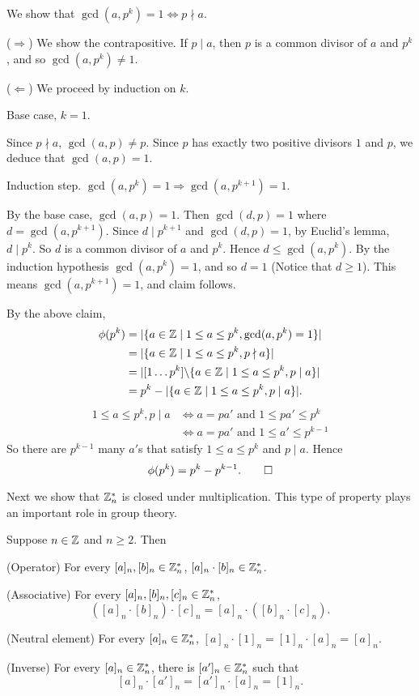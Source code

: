 \begin{solve}
    We show that $\gcd(a,p^k)=1\Leftrightarrow p\nmid a$.

    ($\Rightarrow$) We show the contrapositive. If $p\mid a$,
    then $p$ is a common divisor of $a$ and $p^k$, and so $\gcd(a,p^k)\neq 1$.

    ($\Leftarrow$) We proceed by induction on $k$.

    Base case, $k=1$.

    Since $p\nmid a$, $\gcd(a,p)\neq p$. Since $p$ has exactly two positive
    divisors $1$ and $p$, we deduce that $\gcd(a,p)=1$.

    Induction step. $\gcd(a,p^k)=1\Rightarrow\gcd(a,p^{k+1})=1$.

    By the base case, $\gcd(a,p)=1$. Then $\gcd(d,p)=1$ where
    $d=\gcd(a,p^{k+1})$. Since $d\mid p^{k+1}$ and $\gcd(d,p)=1$,
    by Euclid's lemma, $d\mid p^k$. So $d$ is a common divisor of $a$
    and $p^k$. Hence $d\leq\gcd(a,p^k)$. By the induction hypothesis
    $\gcd(a,p^k)=1$, and so $d=1$ (Notice that $d\geq 1$). This means
    $\gcd(a,p^{k+1})=1$, and claim follows.

    By the above claim,
    \[\begin{split}
        \phi(p^k)
        &=|\{a\in\mathbb{Z}\mid 1\leq a\leq p^k,\gcd(a,p^k)=1\}|\\
        &=|\{a\in\mathbb{Z}\mid 1\leq a\leq p^k,p\nmid a\}|\\
        &=|[1\dots p^k]\backslash\{a\in\mathbb{Z}\mid 1\leq a\leq p^k,p\mid a\}|\\
        &=p^k-|\{a\in\mathbb{Z}\mid 1\leq a\leq p^k,p\mid a\}|.
    \end{split}\]
    \[\begin{split}
        1\leq a\leq p^k,p\mid a
        &\Longleftrightarrow a=pa'\text{ and }1\leq pa'\leq p^k\\
        &\Longleftrightarrow a=pa'\text{ and }1\leq a'\leq p^{k-1}
    \end{split}\]
    So there are $p^{k-1}$ many $a'$s that satisfy $1\leq a\leq p^k$ and $p\mid a$.
    Hence \[\phi(p^k)=p^k-p^{k-1}.\qedhere\]
\end{solve}

Next we show that $\mathbb{Z}_n^*$ is closed under multiplication.
This type of property plays an important role in group theory.

\begin{theorem}
    Suppose $n\in\mathbb{Z}$ and $n\geq 2$. Then 

    (Operator) For every $[a]_n,[b]_n\in\mathbb{Z}_n^*$, $[a]_n\cdot [b]_n\in\mathbb{Z}_n^*$.

    (Associative) For every $[a]_n,[b]_n,[c]_n\in\mathbb{Z}_n^*$,
    \[([a]_n\cdot [b]_n)\cdot [c]_n=[a]_n\cdot([b]_n\cdot [c]_n).\]

    (Neutral element) For every $[a]_n\in\mathbb{Z}_n^*$, $[a]_n\cdot[1]_n=[1]_n\cdot[a]_n=[a]_n$.

    (Inverse) For every $[a]_n\in\mathbb{Z}_n^*$, there is $[a']_n\in\mathbb{Z}_n^*$ such that
    \[[a]_n\cdot [a']_n=[a']_n\cdot [a]_n=[1]_n.\]
\end{theorem}

